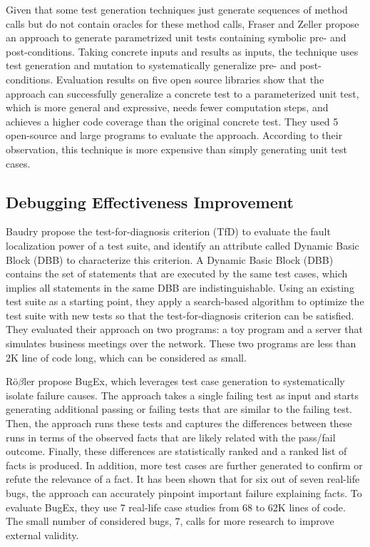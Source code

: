 Given that some test generation techniques just generate sequences of method calls but do not contain oracles for these method calls, Fraser and Zeller \cite{fraser2011generating} propose an approach to generate parametrized unit tests containing symbolic pre- and post-conditions. 
Taking concrete inputs and results as inputs, the technique uses test generation and mutation to systematically generalize pre- and post-conditions. 
Evaluation results on five open source libraries show that the approach can successfully generalize a concrete test to a parameterized unit test, which is more general and expressive, needs fewer computation steps, and achieves a higher code coverage than the original concrete test.
They used 5 open-source and large programs to evaluate the approach.
According to their observation, this technique is more expensive than simply generating unit test cases.

\subsection{Debugging Effectiveness Improvement}
\label{subsec:sota:category-1:debugging-improvement}

Baudry \etal \cite{Baudry:2006:ITS:1134285.1134299} propose the test-for-diagnosis criterion (TfD) to evaluate the fault localization power of a test suite, and identify an attribute called Dynamic Basic Block (DBB) to characterize this criterion.
A Dynamic Basic Block (DBB) contains the set of statements that are executed by the same test cases, which implies all statements in the same DBB are indistinguishable.
Using an existing test suite as a starting point, they apply a search-based algorithm to optimize the test suite with new tests so that the test-for-diagnosis criterion can be satisfied. 
They evaluated their approach on two programs: a toy program and a server that simulates business meetings over the network. 
These two programs are less than 2K line of code long, which can be considered as small.

R{\"o}$\beta$ler \etal\cite{robetaler2012isolating} propose BugEx, which leverages test case generation to systematically isolate failure causes. 
The approach takes a single failing test as input and starts generating additional passing or failing tests that are similar to the failing test. 
Then, the approach runs these tests and captures the differences between these runs in terms of the observed facts that are likely related with the pass/fail outcome. 
Finally, these differences are statistically ranked and a ranked list of facts is produced.
In addition, more test cases are further generated to confirm or refute the relevance of a fact. 
It has been shown that for six out of seven real-life bugs, the approach can accurately pinpoint important failure explaining facts.
To evaluate BugEx, they use 7 real-life case studies from 68 to 62K lines of code. The small number of considered bugs, 7, calls for more research to improve external validity.

